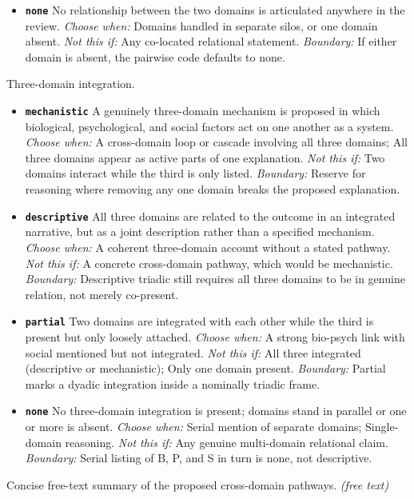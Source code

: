 \documentclass[11pt]{article}
\begin{document}
\begin{description}
\begin{itemize}[leftmargin=1.3em,itemsep=2pt,topsep=2pt]
  \item \textbf{\texttt{none}} No relationship between the two domains is articulated anywhere in the review. {\small \textit{Choose when:} Domains handled in separate silos, or one domain absent. \textit{Not this if:} Any co-located relational statement. \textit{Boundary:} If either domain is absent, the pairwise code defaults to none.}
  \end{itemize}
\item[\texttt{integration\_triadic}] Three-domain integration.
  \begin{itemize}[leftmargin=1.3em,itemsep=2pt,topsep=2pt]
  \item \textbf{\texttt{mechanistic}} A genuinely three-domain mechanism is proposed in which biological, psychological, and social factors act on one another as a system. {\small \textit{Choose when:} A cross-domain loop or cascade involving all three domains; All three domains appear as active parts of one explanation. \textit{Not this if:} Two domains interact while the third is only listed. \textit{Boundary:} Reserve for reasoning where removing any one domain breaks the proposed explanation.}
  \item \textbf{\texttt{descriptive}} All three domains are related to the outcome in an integrated narrative, but as a joint description rather than a specified mechanism. {\small \textit{Choose when:} A coherent three-domain account without a stated pathway. \textit{Not this if:} A concrete cross-domain pathway, which would be mechanistic. \textit{Boundary:} Descriptive triadic still requires all three domains to be in genuine relation, not merely co-present.}
  \item \textbf{\texttt{partial}} Two domains are integrated with each other while the third is present but only loosely attached. {\small \textit{Choose when:} A strong bio-psych link with social mentioned but not integrated. \textit{Not this if:} All three integrated (descriptive or mechanistic); Only one domain present. \textit{Boundary:} Partial marks a dyadic integration inside a nominally triadic frame.}
  \item \textbf{\texttt{none}} No three-domain integration is present; domains stand in parallel or one or more is absent. {\small \textit{Choose when:} Serial mention of separate domains; Single-domain reasoning. \textit{Not this if:} Any genuine multi-domain relational claim. \textit{Boundary:} Serial listing of B, P, and S in turn is none, not descriptive.}
  \end{itemize}
\item[\texttt{integration\_mechanism\_summary}] Concise free-text summary of the proposed cross-domain pathways. \textit{(free text)}
\end{description}
\end{document}
